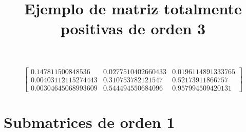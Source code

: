 \documentclass[12pt]{article}
\begin{document}
\title{Ejemplo de matriz totalmente positivas de orden 3}
\maketitle

$$\left[\begin{matrix}0.147811500848536 & 0.0277510402660433 & 0.0196114891333765\\0.00403112115274443 & 0.310753782121547 & 0.52173911866757\\0.00304645068993609 & 0.544494550684096 & 0.957994509420131\end{matrix}\right]$$


\section*{Submatrices de orden 1}
\end{document}
